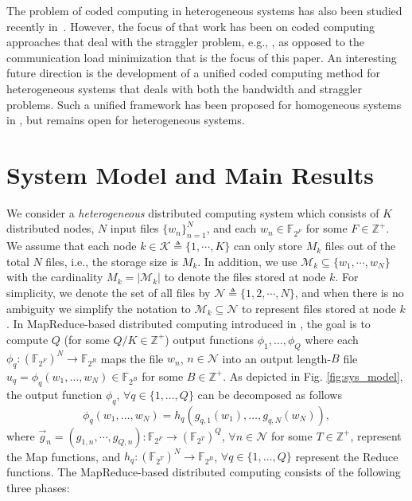 \documentclass[conference]{IEEEtran}
\begin{document}
The problem of coded computing in heterogeneous systems has also been studied recently in~\cite{SauravISIT}. However, the focus of that work has been on coded computing approaches that deal with the straggler problem, e.g., \cite{lee2015speeding}, as opposed to the communication load minimization that is the focus of this paper. An interesting future direction is the development of a unified coded computing method for heterogeneous systems that deals with both the bandwidth and straggler problems. Such a unified framework has been proposed for homogeneous systems in \cite{li2016unified}, but remains open for heterogeneous systems.



\section{System Model and Main Results}

We consider a \emph{heterogeneous} distributed computing system which consists of $K$ distributed nodes, $N$ input files $\{w_n\}_{n=1}^N$, and each $w_n \in {\mathbb{F}}_{2^F}$ for some $F \in \mathbb{Z}^+$. We assume that each node $k\!\in\!\mathcal{K}\triangleq \{1,\cdots,K\}$ can only store $M_k$ files out of the total $N$ files, i.e., the storage size is $M_k$. In addition, we use $\mathcal{M}_k\!\subseteq\! \{w_1,\cdots,w_N\}$ with the cardinality $M_k=|\mathcal{M}_k|$ to denote the files stored at node $k$. For simplicity, we denote the set of all files by $\mathcal{N}\triangleq \{1,2,\cdots,N\}$, and when there is no ambiguity we simplify the notation to $\mathcal{M}_k\subseteq \mathcal{N}$ to represent files stored at node $k$. In MapReduce-based distributed computing introduced in \cite{dean2004mapreduce}, the goal is to compute $Q$ (for some $Q/K\in \mathbb{Z}^+$) output functions $\phi_1,\dots,\phi_Q$ where each $\phi_q:({\mathbb{F}}_{2^F})^N\rightarrow {\mathbb{F}}_{2^B}$ maps the file $w_n$, $n\in\mathcal{N}$ into an output length-$B$ file $u_q=\phi_q(w_1,\dots,w_N)\in {\mathbb{F}}_{2^B}$ for some $B\in \mathbb{Z}^+$. As depicted in Fig. \ref{fig:sys_model}, the output function $\phi_q$, $\forall q\in\{1,\dots,Q\}$ can be decomposed as follows
\begin{equation}
\phi_q(w_1,\dots,w_N)=h_q(g_{q,1}(w_1),\dots,g_{q,N}(w_N)),
\label{define_MapRed_D}
\end{equation}
where ${\overrightarrow{g}}_n=(g_{1,n},\cdots,g_{Q,n}): {\mathbb{F}}_{2^{F}}\rightarrow ({\mathbb{F}}_{2^T})^Q$, $\forall n\in\mathcal{N}$ for some $T\in \mathbb{Z}^+$, represent the Map functions, and $h_q:({\mathbb{F}_{2^T}})^N\rightarrow {\mathbb{F}_{2^B}}$, $\forall q\in\{1,\dots,Q\}$ represent the Reduce functions. The MapReduce-based distributed computing consists of the following three phases:
\end{document}
